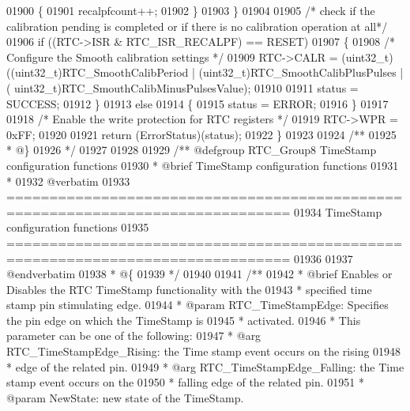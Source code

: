\begin{DoxyCode}
01900     \{
01901       recalpfcount++;
01902     \}
01903   \}
01904 
01905   \textcolor{comment}{/* check if the calibration pending is completed or if there is no calibration operation at all*/}
01906   \textcolor{keywordflow}{if} ((RTC->ISR & RTC_ISR_RECALPF) == RESET)
01907   \{
01908     \textcolor{comment}{/* Configure the Smooth calibration settings */}
01909     RTC->CALR = (uint32\_t)((uint32\_t)RTC\_SmoothCalibPeriod | (uint32\_t)RTC\_SmoothCalibPlusPulses | (
      uint32\_t)RTC\_SmouthCalibMinusPulsesValue);
01910 
01911     status = SUCCESS;
01912   \}
01913   \textcolor{keywordflow}{else}
01914   \{
01915     status = ERROR;
01916   \}
01917 
01918   \textcolor{comment}{/* Enable the write protection for RTC registers */}
01919   RTC->WPR = 0xFF;
01920 
01921   \textcolor{keywordflow}{return} (ErrorStatus)(status);
01922 \}
01923 
01924 \textcolor{comment}{/**}
01925 \textcolor{comment}{  * @\}}
01926 \textcolor{comment}{  */}
01927 
01928 
01929 \textcolor{comment}{/** @defgroup RTC\_Group8 TimeStamp configuration functions}
01930 \textcolor{comment}{ *  @brief   TimeStamp configuration functions }
01931 \textcolor{comment}{ *}
01932 \textcolor{comment}{@verbatim   }
01933 \textcolor{comment}{ ===============================================================================}
01934 \textcolor{comment}{                       TimeStamp configuration functions}
01935 \textcolor{comment}{ ===============================================================================  }
01936 \textcolor{comment}{}
01937 \textcolor{comment}{@endverbatim}
01938 \textcolor{comment}{  * @\{}
01939 \textcolor{comment}{  */}
01940 
01941 \textcolor{comment}{/**}
01942 \textcolor{comment}{  * @brief  Enables or Disables the RTC TimeStamp functionality with the }
01943 \textcolor{comment}{  *         specified time stamp pin stimulating edge.}
01944 \textcolor{comment}{  * @param  RTC\_TimeStampEdge: Specifies the pin edge on which the TimeStamp is }
01945 \textcolor{comment}{  *         activated.}
01946 \textcolor{comment}{  *          This parameter can be one of the following:}
01947 \textcolor{comment}{  *            @arg RTC\_TimeStampEdge\_Rising: the Time stamp event occurs on the rising }
01948 \textcolor{comment}{  *                                    edge of the related pin.}
01949 \textcolor{comment}{  *            @arg RTC\_TimeStampEdge\_Falling: the Time stamp event occurs on the }
01950 \textcolor{comment}{  *                                     falling edge of the related pin.}
01951 \textcolor{comment}{  * @param  NewState: new state of the TimeStamp.}

\end{DoxyCode}
